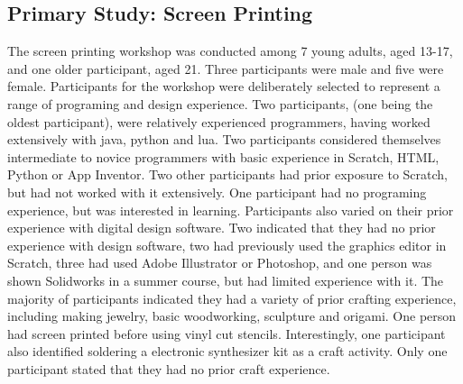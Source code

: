 \documentclass{sigchi}
\begin{document}
\subsection{Primary Study: Screen Printing}
The screen printing workshop was conducted among 7 young adults, aged 13-17, and one older participant, aged 21. Three participants were male and five were female. Participants for the workshop were deliberately selected to represent a range of programing and design experience. Two participants, (one being the oldest participant), were relatively experienced programmers, having worked extensively with java, python and lua. Two participants considered themselves intermediate to novice programmers with basic experience in Scratch, HTML, Python or App Inventor. Two other participants had prior exposure to Scratch, but had not worked with it extensively. One participant had no programing experience, but was interested in learning. Participants also varied on their prior experience with digital design software. Two indicated that they had no prior experience with design software, two had previously used the graphics editor in Scratch, three had used Adobe Illustrator or Photoshop, and one person was shown Solidworks in a summer course, but had limited experience with it. The majority of participants indicated they had a variety of prior crafting experience, including making jewelry, basic woodworking, sculpture and origami. One person had screen printed before using vinyl cut stencils. Interestingly, one participant also identified soldering a electronic synthesizer kit as a craft activity. Only one participant stated that they had no prior craft experience.
\end{document}
